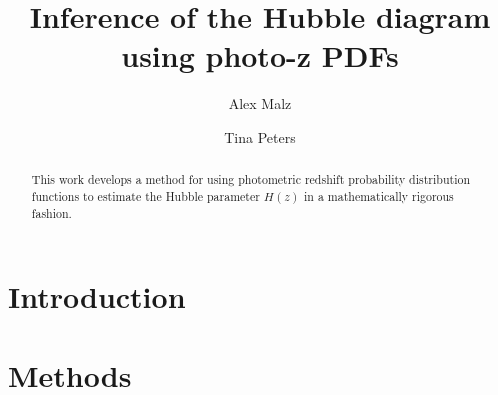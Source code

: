 \documentclass[12pt, onecolumn]{emulateapj}
\begin{document}
\title{Inference of the Hubble diagram using photo-z PDFs}

\author{Alex Malz}
\author{Tina Peters}

\begin{abstract}
This work develops a method for using photometric redshift probability distribution functions to estimate the Hubble parameter $H(z)$ in a mathematically rigorous fashion.
\end{abstract}

\keywords{}

\section{Introduction}
\label{sec:intro}

\citet{Kelly2008}

\section{Methods}
\label{sec:meth}




\end{document}
